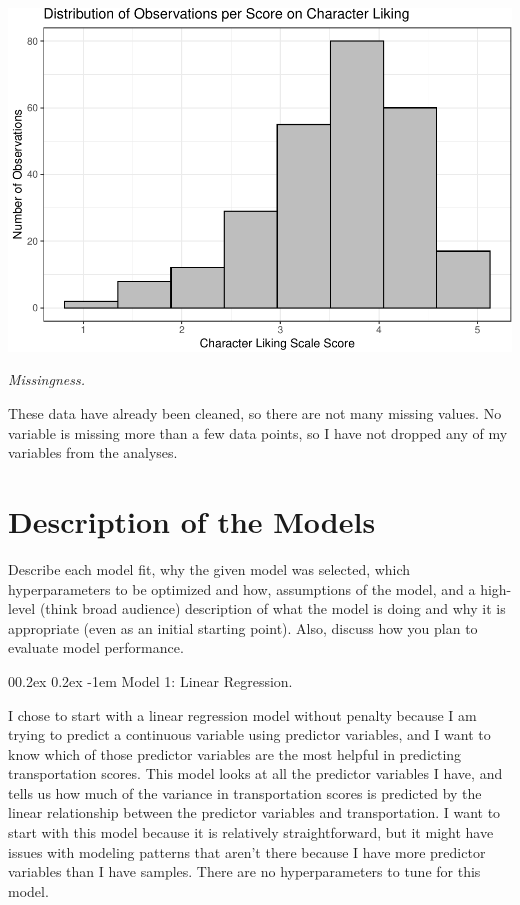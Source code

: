 \documentclass[
  man,floatsintext]{apa6}
\makeatletter
\let\oldparagraph\paragraph
\renewcommand{\paragraph}[1]{\oldparagraph{#1}\mbox{}}
\renewcommand{\paragraph}{\@startsection{paragraph}{4}{\parindent}%
  {0\baselineskip \@plus 0.2ex \@minus 0.2ex}%
  {-1em}%
  {\normalfont\normalsize\bfseries\itshape\typesectitle}}
\makeatother
\begin{document}
\includegraphics{Final_Eliott_files/figure-latex/unnamed-chunk-7-1.pdf}

\emph{Missingness.}

These data have already been cleaned, so there are not many missing values. No variable is missing more than a few data points, so I have not dropped any of my variables from the analyses.

\hypertarget{description-of-the-models}{%
\section{Description of the Models}\label{description-of-the-models}}

Describe each model fit, why the given
model was selected, which hyperparameters to be optimized and how,
assumptions of the model, and a high-level (think broad audience) description of
what the model is doing and why it is appropriate (even as an initial starting
point). Also, discuss how you plan to evaluate model performance.

\hypertarget{model-1-linear-regression.}{%
\paragraph{Model 1: Linear Regression.}\label{model-1-linear-regression.}}

I chose to start with a linear regression model without penalty because I am trying to predict a continuous variable using predictor variables, and I want to know which of those predictor variables are the most helpful in predicting transportation scores. This model looks at all the predictor variables I have, and tells us how much of the variance in transportation scores is predicted by the linear relationship between the predictor variables and transportation. I want to start with this model because it is relatively straightforward, but it might have issues with modeling patterns that aren't there because I have more predictor variables than I have samples. There are no hyperparameters to tune for this model.
\end{document}
